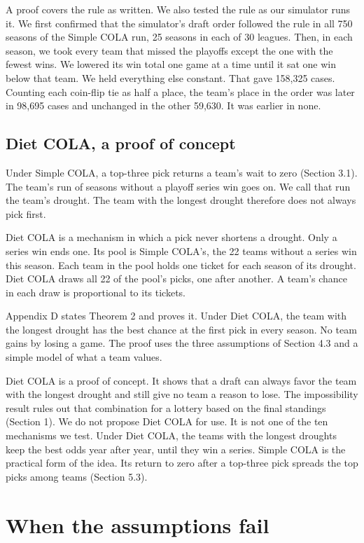 \documentclass[11pt,letterpaper]{article}
\begin{document}
A proof covers the rule as written. We also tested the rule as our simulator runs it. We first confirmed that the simulator's draft order followed the rule in all 750 seasons of the Simple COLA run, 25 seasons in each of 30 leagues. Then, in each season, we took every team that missed the playoffs except the one with the fewest wins. We lowered its win total one game at a time until it sat one win below that team. We held everything else constant. That gave 158,325 cases. Counting each coin-flip tie as half a place, the team's place in the order was later in 98,695 cases and unchanged in the other 59,630. It was earlier in none.

\subsection{Diet COLA, a proof of concept}

Under Simple COLA, a top-three pick returns a team's wait to zero (Section 3.1). The team's run of seasons without a playoff series win goes on. We call that run the team's drought. The team with the longest drought therefore does not always pick first.

Diet COLA is a mechanism in which a pick never shortens a drought. Only a series win ends one. Its pool is Simple COLA's, the 22 teams without a series win this season. Each team in the pool holds one ticket for each season of its drought. Diet COLA draws all 22 of the pool's picks, one after another. A team's chance in each draw is proportional to its tickets.

Appendix D states Theorem 2 and proves it. Under Diet COLA, the team with the longest drought has the best chance at the first pick in every season. No team gains by losing a game. The proof uses the three assumptions of Section 4.3 and a simple model of what a team values.

Diet COLA is a proof of concept. It shows that a draft can always favor the team with the longest drought and still give no team a reason to lose. The impossibility result rules out that combination for a lottery based on the final standings (Section 1). We do not propose Diet COLA for use. It is not one of the ten mechanisms we test. Under Diet COLA, the teams with the longest droughts keep the best odds year after year, until they win a series. Simple COLA is the practical form of the idea. Its return to zero after a top-three pick spreads the top picks among teams (Section 5.3).

\section{When the assumptions fail}
\end{document}
